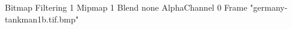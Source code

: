 {Bitmap
	{Filtering 1}
	{Mipmap 1}
	{Blend none}
	{AlphaChannel 0}
	{Frame "germany-tankman1b.tif.bmp"}
}
